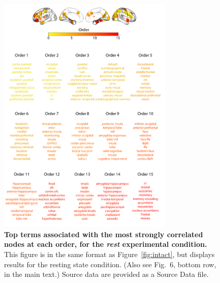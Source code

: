 \documentclass[english]{article}
\newcommand{\neurosynth}{6}
\begin{document}
\begin{figure}[p!]
\centering
\includegraphics[width=0.75\textwidth]{figs/supp_15_rest}
\caption{\textbf{Top terms associated with the most strongly
      correlated nodes at each order, for the \textit{rest} experimental
    condition.}  This figure is in the same format as
  Figure~\ref{fig:intact}, but displays results for the
  resting state condition.  (Also see Fig.~\neurosynth,
bottom row, in the main text.) Source data are provided as a Source Data file.}
\label{fig:rest}
\end{figure}
\end{document}
